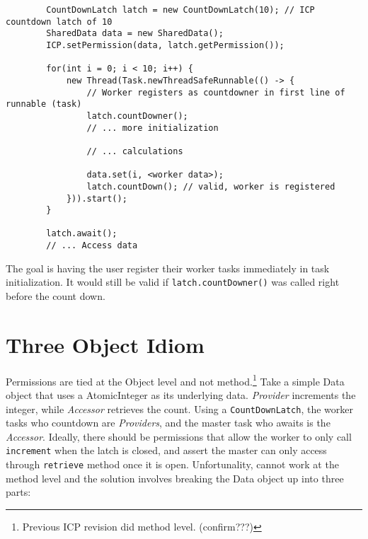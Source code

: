 \documentclass[11pt]{article}
\begin{document}
    \begin{lstlisting}
        CountDownLatch latch = new CountDownLatch(10); // ICP countdown latch of 10
        SharedData data = new SharedData();
        ICP.setPermission(data, latch.getPermission());

        for(int i = 0; i < 10; i++) {
            new Thread(Task.newThreadSafeRunnable(() -> {
                // Worker registers as countdowner in first line of runnable (task)
                latch.countDowner();
                // ... more initialization

                // ... calculations

                data.set(i, <worker data>);
                latch.countDown(); // valid, worker is registered
            })).start();
        }

        latch.await();
        // ... Access data
    \end{lstlisting}

    The goal is having the user register their worker tasks immediately in task initialization. It would still be
    valid if \lstinline{latch.countDowner()} was called right before the count down.

    \section{Three Object Idiom}
    Permissions are tied at the Object level and not method.\footnote{Previous ICP revision did method level. (confirm???)}
    Take a simple Data object that uses a AtomicInteger as its underlying data. \textit{Provider} increments the integer,
    while \textit{Accessor} retrieves the count. Using a \lstinline{CountDownLatch}, the worker tasks who countdown
    are \textit{Providers}, and the master task who awaits is the \textit{Accessor}. Ideally, there should be permissions
    that allow the worker to only call \lstinline{increment} when the latch is closed, and assert the master can only
    access through \lstinline{retrieve} method once it is open. Unfortunality, cannot work at the method level and the
    solution involves breaking the Data object up into three parts:
\end{document}
